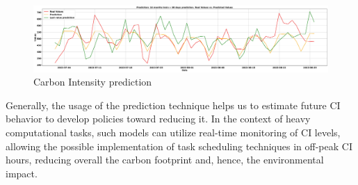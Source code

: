\begin{figure}[H]
    \centering
    \includegraphics[width=1\textwidth]{Figures/CI_PRED.jpg}
    \caption{Carbon Intensity prediction}
    \label{fig:CI_PRED}
\end{figure}

Generally, the usage of the prediction technique helps us to estimate future CI behavior to develop policies toward reducing it. In the context of heavy computational tasks, such models can utilize real-time monitoring of CI levels, allowing the possible implementation of task scheduling techniques in off-peak CI hours, reducing overall the carbon footprint and, hence, the environmental impact.  
